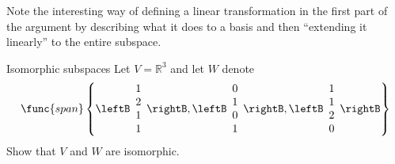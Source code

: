 Note the interesting way of defining a linear transformation in the first
part of the argument by describing what it does to a basis and then
``extending it linearly'' to the entire subspace.

\begin{example}{Isomorphic subspaces}{}
Let $V=\mathbb{R}^{3}$ and let $W$ denote 
\begin{equation*}
\func{span}\left\{ \leftB 
\begin{array}{r}
1 \\ 
2 \\ 
1 \\ 
1
\end{array}
\rightB ,\leftB 
\begin{array}{r}
0 \\ 
1 \\ 
0 \\ 
1
\end{array}
\rightB ,\leftB 
\begin{array}{r}
1 \\ 
1 \\ 
2 \\ 
0
\end{array}
\rightB \right\}
\end{equation*}
Show that $V$ and $W$ are isomorphic. 
\end{example}

